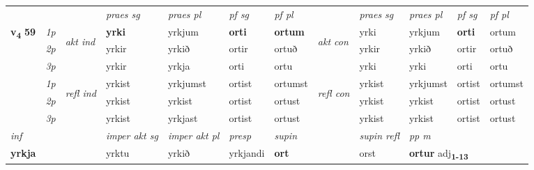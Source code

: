 \begin{longtable}[l]{X>{\footnotesize\itshape}llXXXXlXXXX}
 & &   & \textit{praes sg}  & \textit{praes pl}    & \textit{ pf sg} & \textit{pf pl} & & \textit{praes sg}  & \textit{praes pl}    & \textit{pf sg} & \textit{pf pl }  \\ \cmidrule{4-7} \cmidrule{9-12}
 \multirow{2}{*}{{{\textbf{v{\textsubscript{4}}} \Large{\textbf{59}}}}}  & 1p & \multirow{3}{*}{\begin{turn}{90}\textit{akt ind}\end{turn}} & \textbf{yrki} & yrkjum & \textbf{orti} & \textbf{ortum} & \multirow{3}{*}{\begin{turn}{90}\textit{akt con}\end{turn}} &yrki & yrkjum & \textbf{orti} & ortum\\*
 & 2p &  &  yrkir  & yrkið & ortir & ortuð & & yrkir & yrkið & ortir & ortuð \\*
 & 3p &  & yrkir & yrkja & orti & ortu & & yrki & yrki& orti & ortu \\*
\cmidrule{4-7} \cmidrule{9-12}
 & 1p & \multirow{3}{*}{\begin{turn}{90}\textit{refl ind}\end{turn}}  & yrkist & yrkjumst & ortist & ortumst & \multirow{3}{*}{\begin{turn}{90}\textit{refl con}\end{turn}}  &yrkist & yrkjumst & ortist & ortumst \\*
 & 2p &  & yrkist & yrkist & ortist & ortust & &yrkist & yrkist & ortist & ortust \\*
 & 3p  & & yrkist & yrkjast & ortist & ortust & & yrkist & yrkist& ortist & ortust \\*
\cmidrule{4-7} \cmidrule{9-12}

   {\textit{inf}} & &  & \textit{imper akt sg} & \textit{imper akt pl}   & \textit{presp} & \textit{supin} && \textit{supin refl} & \textit{pp m} \\*
  {\textbf{yrkja}} & && yrktu  & yrkið   & yrkjandi &  \textbf{ort} && orst & \multicolumn{2}{l}{\textbf{ortur} adj\textbf{\textsubscript{1-13}}} \\*


\end{longtable}

